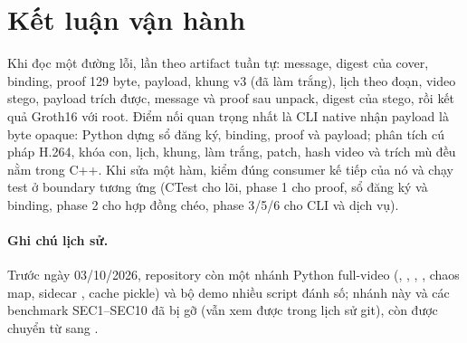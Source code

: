 \documentclass[11pt,a4paper]{article}
\begin{document}
\section{Kết luận vận hành}

Khi đọc một đường lỗi, lần theo artifact tuần tự: message, digest của cover, binding,
proof 129 byte, payload, khung v3 (đã làm trắng), lịch theo đoạn, video stego, payload
trích được, message và proof sau unpack, digest của stego, rồi kết quả Groth16 với root.
Điểm nối quan trọng nhất là CLI native nhận payload là byte opaque: Python dựng sổ đăng
ký, binding, proof và payload; phân tích cú pháp H.264, khóa con, lịch, khung, làm
trắng, patch, hash video và trích mù đều nằm trong C++. Khi sửa một hàm, kiểm
đúng consumer kế tiếp của nó và chạy test ở boundary tương ứng (CTest cho lõi, phase 1
cho proof, sổ đăng ký và binding, phase 2 cho hợp đồng chéo, phase 3/5/6 cho CLI và
dịch vụ).

\paragraph{Ghi chú lịch sử.} Trước ngày 03/10/2026, repository còn một nhánh Python
full-video (, , ,
, chaos map, sidecar , cache pickle) và bộ
demo nhiều script đánh số; nhánh này và các benchmark SEC1--SEC10 đã bị gỡ (vẫn xem
được trong lịch sử git), còn  được chuyển từ
 sang .
\end{document}
